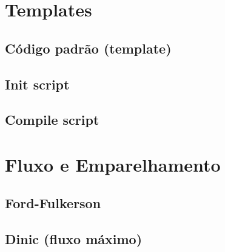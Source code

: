 \setcounter{page}{1}
\section{Templates}

\subsection{Código padrão (template)}


\subsection{Init script}


\subsection{Compile script}


\section{Fluxo e Emparelhamento}

\subsection{Ford-Fulkerson}


\subsection{Dinic (fluxo máximo)}


% 

% 

% 

